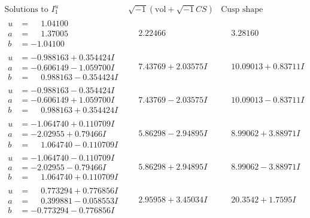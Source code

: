 \documentclass[1p]{elsarticle_modified}
\theoremstyle{definition}
\newcommand{\I}{\sqrt{-1}}
\begin{document}
$$\begin{array}{c|c|c}  
\text{Solutions to }I^u_{1}& \I (\text{vol} + \sqrt{-1}CS) & \text{Cusp shape}\\
 \hline 
\begin{aligned}
u &= \phantom{-}1.04100\phantom{ +0.000000I} \\
a &= \phantom{-}1.37005\phantom{ +0.000000I} \\
b &= -1.04100\phantom{ +0.000000I}\end{aligned}
 & \phantom{-}2.22466\phantom{ +0.000000I} & \phantom{-}3.28160\phantom{ +0.000000I} \\ \hline\begin{aligned}
u &= -0.988163 + 0.354424 I \\
a &= -0.606149 - 1.059700 I \\
b &= \phantom{-}0.988163 - 0.354424 I\end{aligned}
 & \phantom{-}7.43769 + 2.03575 I & \phantom{-}10.09013 + 0.83711 I \\ \hline\begin{aligned}
u &= -0.988163 - 0.354424 I \\
a &= -0.606149 + 1.059700 I \\
b &= \phantom{-}0.988163 + 0.354424 I\end{aligned}
 & \phantom{-}7.43769 - 2.03575 I & \phantom{-}10.09013 - 0.83711 I \\ \hline\begin{aligned}
u &= -1.064740 + 0.110709 I \\
a &= -2.02955 + 0.79466 I \\
b &= \phantom{-}1.064740 - 0.110709 I\end{aligned}
 & \phantom{-}5.86298 - 2.94895 I & \phantom{-}8.99062 + 3.88971 I \\ \hline\begin{aligned}
u &= -1.064740 - 0.110709 I \\
a &= -2.02955 - 0.79466 I \\
b &= \phantom{-}1.064740 + 0.110709 I\end{aligned}
 & \phantom{-}5.86298 + 2.94895 I & \phantom{-}8.99062 - 3.88971 I \\ \hline\begin{aligned}
u &= \phantom{-}0.773294 + 0.776856 I \\
a &= \phantom{-}0.399881 - 0.058553 I \\
b &= -0.773294 - 0.776856 I\end{aligned}
 & \phantom{-}2.95958 + 3.45034 I & \phantom{-}20.3542 + 1.7595 I \\ \hline\begin{aligned}

\end{aligned}
\end{array}$$
\end{document}
